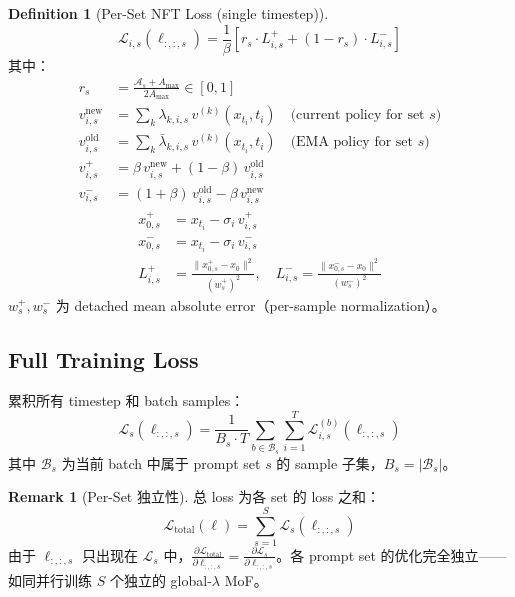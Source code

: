 \documentclass[11pt,a4paper]{article}
\newcommand{\loss}{\mathcal{L}}
\newcommand{\adv}{\mathcal{A}}
\theoremstyle{definition}
\newtheorem{definition}{Definition}
\newtheorem{remark}{Remark}
\begin{document}
\begin{definition}[Per-Set NFT Loss (single timestep)]
\begin{equation}
\boxed{
\loss_{i,s}(\ell_{:,:,s}) = \frac{1}{\beta}\left[
r_s \cdot L^+_{i,s} + (1 - r_s) \cdot L^-_{i,s}
\right]
}
\label{eq:per_set_nft_loss}
\end{equation}
其中：
\begin{align}
r_s &= \frac{\adv_s + A_{\max}}{2 A_{\max}} \in [0, 1] \label{eq:normalized_adv} \\
v^{\mathrm{new}}_{i,s} &= \sum_k \lambda_{k,i,s}\, v^{(k)}(x_{t_i}, t_i) \quad\text{(current policy for set $s$)} \label{eq:v_new_s} \\
v^{\mathrm{old}}_{i,s} &= \sum_k \bar{\lambda}_{k,i,s}\, v^{(k)}(x_{t_i}, t_i) \quad\text{(EMA policy for set $s$)} \label{eq:v_old_s} \\
v^+_{i,s} &= \beta\, v^{\mathrm{new}}_{i,s} + (1-\beta)\, v^{\mathrm{old}}_{i,s} \label{eq:v_plus} \\
v^-_{i,s} &= (1+\beta)\, v^{\mathrm{old}}_{i,s} - \beta\, v^{\mathrm{new}}_{i,s} \label{eq:v_minus}
\end{align}
\begin{align}
x^+_{0,s} &= x_{t_i} - \sigma_i\, v^+_{i,s} \label{eq:x0_plus} \\
x^-_{0,s} &= x_{t_i} - \sigma_i\, v^-_{i,s} \label{eq:x0_minus} \\
L^+_{i,s} &= \frac{\|x^+_{0,s} - x_0\|^2}{(w^+_s)^2}, \quad
L^-_{i,s} = \frac{\|x^-_{0,s} - x_0\|^2}{(w^-_s)^2} \label{eq:L_plus_minus}
\end{align}
$w^+_s, w^-_s$ 为 detached mean absolute error（per-sample normalization）。
\end{definition}

\subsection{Full Training Loss}

累积所有 timestep 和 batch samples：
\begin{equation}
\loss_s(\ell_{:,:,s}) = \frac{1}{B_s \cdot T}\sum_{b \in \mathcal{B}_s}\sum_{i=1}^T \loss^{(b)}_{i,s}(\ell_{:,:,s})
\label{eq:full_loss}
\end{equation}
其中 $\mathcal{B}_s$ 为当前 batch 中属于 prompt set $s$ 的 sample 子集，$B_s = |\mathcal{B}_s|$。

\begin{remark}[Per-Set 独立性]
总 loss 为各 set 的 loss 之和：
\begin{equation}
\loss_{\mathrm{total}}(\ell) = \sum_{s=1}^S \loss_s(\ell_{:,:,s})
\end{equation}
由于 $\ell_{:,:,s}$ 只出现在 $\loss_s$ 中，$\frac{\partial \loss_{\mathrm{total}}}{\partial \ell_{:,:,s}} = \frac{\partial \loss_s}{\partial \ell_{:,:,s}}$。各 prompt set 的优化完全独立——如同并行训练 $S$ 个独立的 global-$\lambda$ MoF。
\end{remark}
\end{document}
